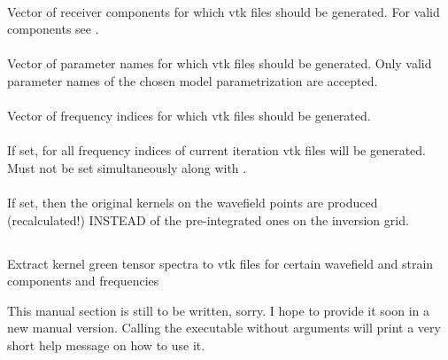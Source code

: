 \paragraph{}
Vector of receiver components for which vtk files should be generated. For valid components see .
\paragraph{}
Vector of parameter names for which vtk files should be generated. Only valid parameter names of the chosen model parametrization are accepted. 
\paragraph{}
Vector of  frequency indices for which vtk files should be generated. 
\paragraph{}
If set, for all frequency indices of current iteration vtk files will be generated. Must not be set simultaneously along with .
\paragraph{}
If set, then the original kernels on the wavefield points are produced (recalculated!) INSTEAD of the pre-integrated ones on the inversion grid.
%
%
\subsection{} \label{programs_scripts,sec:bin_prog,sec:kgt_2_vtk}
Extract kernel green tensor spectra to vtk files for certain wavefield and strain components and frequencies

This manual section is still to be written, sorry. I hope to provide it soon in a new manual version. %
Calling the executable without arguments will print a very short help message on how to use it.
%
%
